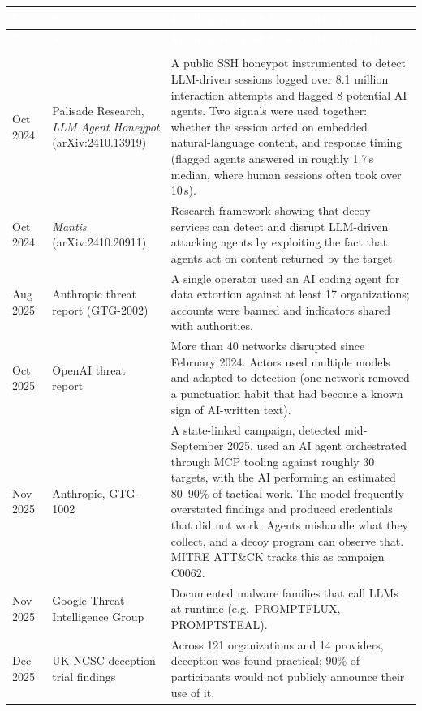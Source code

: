 \documentclass[11pt,letterpaper]{article}
\newcommand{\hd}[1]{\textcolor{white}{\bfseries #1}}
\newcommand{\tablefinish}{\arrayrulecolor{deepindigo}\specialrule{0.8pt}{0pt}{0pt}\arrayrulecolor{black}}
\newcommand{\zebra}{\rowcolors{2}{white}{paleindigo!75}}
\begin{document}
{\footnotesize
\zebra
\begin{longtable}{L{1.6cm} L{3.3cm} L{10.85cm}}
\hd{Date} & \hd{Source} & \hd{Finding relevant to deception} \\
\endfirsthead
{}
\hd{Date} & \hd{Source} & \hd{Finding relevant to deception (continued)} \\
\endhead
{} \\
\endfoot
\tablefinish
\endlastfoot
Oct 2024 & Palisade Research, \emph{LLM Agent Honeypot} (arXiv:2410.13919) & A public SSH honeypot instrumented to detect LLM-driven sessions logged over 8.1 million interaction attempts and flagged 8 potential AI agents. Two signals were used together: whether the session acted on embedded natural-language content, and response timing (flagged agents answered in roughly 1.7\,s median, where human sessions often took over 10\,s). \\
Oct 2024 & \emph{Mantis} (arXiv:2410.20911) & Research framework showing that decoy services can detect and disrupt LLM-driven attacking agents by exploiting the fact that agents act on content returned by the target. \\
Aug 2025 & Anthropic threat report (GTG-2002) & A single operator used an AI coding agent for data extortion against at least 17 organizations; accounts were banned and indicators shared with authorities. \\
Oct 2025 & OpenAI threat report & More than 40 networks disrupted since February 2024. Actors used multiple models and adapted to detection (one network removed a punctuation habit that had become a known sign of AI-written text). \\
Nov 2025 & Anthropic, GTG-1002 & A state-linked campaign, detected mid-September 2025, used an AI agent orchestrated through MCP tooling against roughly 30 targets, with the AI performing an estimated 80--90\% of tactical work. The model frequently overstated findings and produced credentials that did not work. Agents mishandle what they collect, and a decoy program can observe that. MITRE ATT\&CK tracks this as campaign C0062. \\
Nov 2025 & Google Threat Intelligence Group & Documented malware families that call LLMs at runtime (e.g.\ PROMPTFLUX, PROMPTSTEAL). \\
Dec 2025 & UK NCSC deception trial findings & Across 121 organizations and 14 providers, deception was found practical; 90\% of participants would not publicly announce their use of it. \\

\end{longtable}}
\end{document}
